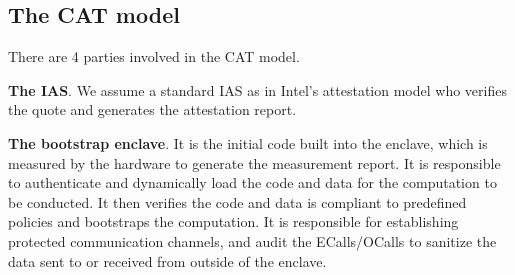 {%

\subsection{The CAT model}

There are 4 parties involved in the CAT model.


\vspace{3pt}\noindent\textbf{The IAS}. We assume a standard IAS as in Intel's attestation model who verifies the quote and generates the attestation report. 

\vspace{3pt}\noindent\textbf{The bootstrap enclave}. It is the initial code built into the enclave, which is measured by the hardware to generate the measurement report. It is responsible to authenticate and dynamically load the code and data for the computation to be conducted. It then verifies the code and data is compliant to predefined policies and bootstraps the computation. It is responsible for establishing protected communication channels, and audit the ECalls/OCalls to sanitize the data sent to or received from outside of the enclave.

}
